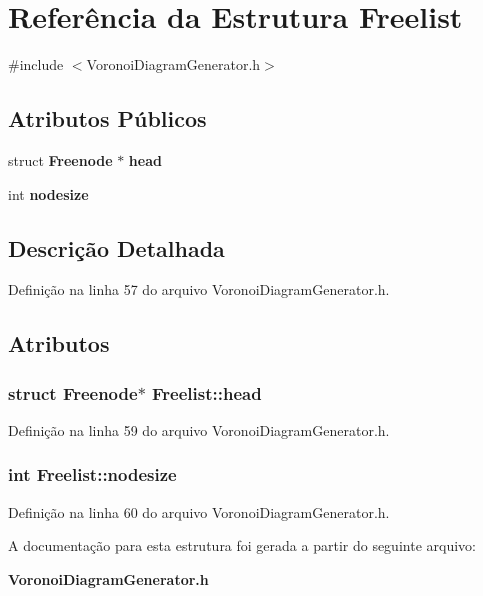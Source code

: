 \section{Referência da Estrutura Freelist}
\label{struct_freelist}


{\ttfamily \#include $<$Voronoi\+Diagram\+Generator.\+h$>$}

\subsection*{Atributos Públicos}
\begin{DoxyCompactItemize}
\item 
struct {\bf Freenode} $\ast$ {\bf head}
\item 
int {\bf nodesize}
\end{DoxyCompactItemize}


\subsection{Descrição Detalhada}


Definição na linha 57 do arquivo Voronoi\+Diagram\+Generator.\+h.



\subsection{Atributos}
\subsubsection[{head}]{\setlength{\rightskip}{0pt plus 5cm}struct {\bf Freenode}$\ast$ Freelist\+::head}\label{struct_freelist_a6ffc288bbbb434089859e183ccf73833}


Definição na linha 59 do arquivo Voronoi\+Diagram\+Generator.\+h.

\subsubsection[{nodesize}]{\setlength{\rightskip}{0pt plus 5cm}int Freelist\+::nodesize}\label{struct_freelist_a6e0df70668f1ea4f43a073adfddede83}


Definição na linha 60 do arquivo Voronoi\+Diagram\+Generator.\+h.



A documentação para esta estrutura foi gerada a partir do seguinte arquivo\+:\begin{DoxyCompactItemize}
\item 
{\bf Voronoi\+Diagram\+Generator.\+h}\end{DoxyCompactItemize}
